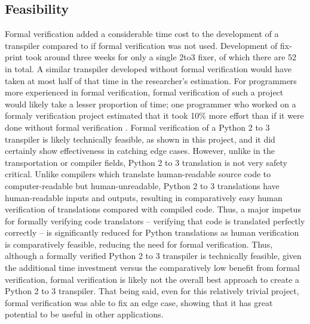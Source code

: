 \subsection{Feasibility}
Formal verification added a considerable time cost to the development of a transpiler compared to if formal verification was not used. Development of fix-print took around three weeks for only a single 2to3 fixer, of which there are 52 in total. A similar transpiler developed without formal verification would have taken at most half of that time in the researcher's estimation. For programmers more experienced in formal verification, formal verification of such a project would likely take a lesser proportion of time; one programmer who worked on a formaly verification project estimated that it took 10\% more effort than if it were done without formal verification \autocite{Woodcock}. Formal verification of a Python 2 to 3 transpiler is likely technically feasible, as shown in this project, and it did certainly show effectiveness in catching edge cases. However, unlike in the transportation or compiler fields, Python 2 to 3 translation is not very safety critical. Unlike compilers which translate human-readable source code to computer-readable but human-unreadable, Python 2 to 3 translations have human-readable inputs and outputs, resulting in comparatively easy human verification of translations compared with compiled code. Thus, a major impetus for formally verifying code translators -- verifying that code is translated perfectly correctly -- is significantly reduced for Python translations as human verification is comparatively feasible, reducing the need for formal verification. Thus, although a formally verified Python 2 to 3 transpiler is technically feasible, given the additional time investment versus the comparatively low benefit from formal verification, formal verification is likely not the overall best approach to create a Python 2 to 3 transpiler. That being said, even for this relatively trivial project, formal verification was able to fix an edge case, showing that it has great potential to be useful in other applications.